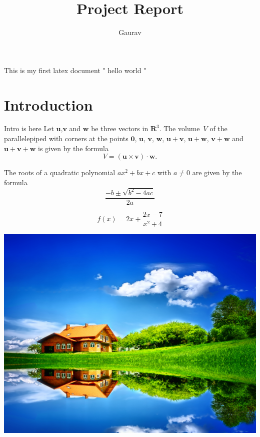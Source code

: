 \documentclass[a4paper,7pt]{article}
\title{Project Report}
\begin{document}
\author{Gaurav}


\maketitle
\date
{}


\newpage
\tableofcontents		%



\newpage		%
This is my first latex document
" hello  world "
\section{Introduction}
Intro is here		
Let $\mathbf{u}$,$\mathbf{v}$ and $\mathbf{w}$ be three
vectors in ${\mathbf R}^3$. The volume~$V$ of the
parallelepiped with corners at the points
$\mathbf{0}$, $\mathbf{u}$, $\mathbf{v}$,
$\mathbf{w}$, $\mathbf{u}+\mathbf{v}$,
$\mathbf{u}+\mathbf{w}$, $\mathbf{v}+\mathbf{w}$
and $\mathbf{u}+\mathbf{v}+\mathbf{w}$
is given by the formula
\[ V = (\mathbf{u} \times \mathbf{v}) \cdot \mathbf{w}.\]


The roots of a quadratic polynomial $a x^2 + bx + c$ with
$a \neq 0$ are given by the formula
\[ \frac{-b \pm \sqrt{b^2 - 4ac}}{2a} \]

\[f(x)=2x+\frac{2x-7}{x^2+4}\]




\includegraphics[scale=0.4]{4.jpg}
\end{document}
